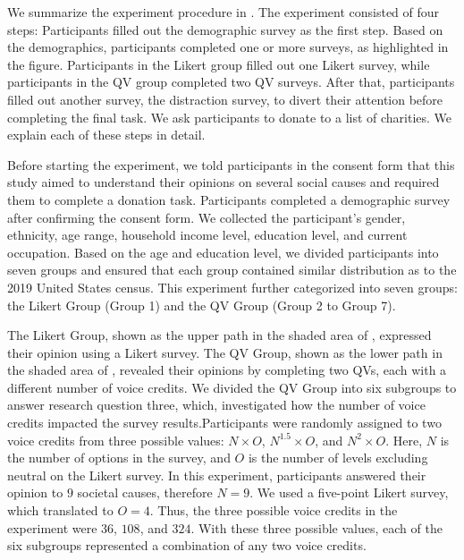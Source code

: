 We summarize the experiment procedure in . The experiment consisted of four steps: Participants filled out the demographic survey as the first step. Based on the demographics, participants completed one or more surveys, as highlighted in the figure. Participants in the Likert group filled out one Likert survey, while participants in the QV group completed two QV surveys. After that, participants filled out another survey, the distraction survey, to divert their attention before completing the final task. We ask participants to donate to a list of charities. We explain each of these steps in detail.

Before starting the experiment, we told participants in the consent form that this study aimed to understand their opinions on several social causes and required them to complete a donation task. Participants completed a demographic survey after confirming the consent form. We collected the participant's gender, ethnicity, age range, household income level, education level, and current occupation. Based on the age and education level, we divided participants into seven groups and ensured that each group contained similar distribution as to the 2019 United States census. This experiment further categorized into seven groups: the Likert Group (Group 1) and the QV Group (Group 2 to Group 7).\par

The Likert Group, shown as the upper path in the shaded area of , expressed their opinion using a Likert survey. The QV Group, shown as the lower path in the shaded area of , revealed their opinions by completing two QVs, each with a different number of voice credits. We divided the QV Group into six subgroups to answer research question three, which, investigated how the number of voice credits impacted the survey results.Participants were randomly assigned to two voice credits from three possible values: $N \times O$, $N^{1.5} \times O$, and $N^2 \times O$. Here, $N$ is the number of options in the survey, and $O$ is the number of levels excluding neutral on the Likert survey. In this experiment, participants answered their opinion to $9$ societal causes, therefore $N=9$. We used a five-point Likert survey, which translated to $O=4$. Thus, the three possible voice credits in the experiment were $36$, $108$, and $324$. With these three possible values, each of the six subgroups represented a combination of any two voice credits.\par

